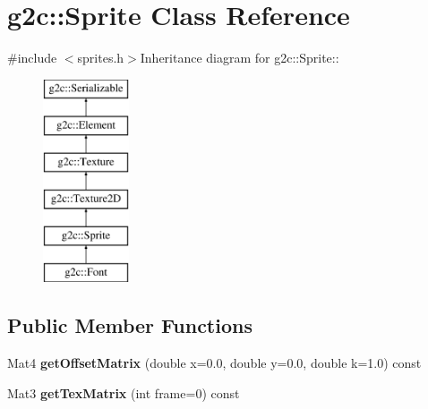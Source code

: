 \hypertarget{classg2c_1_1_sprite}{
\section{g2c::Sprite Class Reference}
\label{classg2c_1_1_sprite}
}


{\ttfamily \#include $<$sprites.h$>$}Inheritance diagram for g2c::Sprite::\begin{figure}[H]
\begin{center}
\leavevmode
\includegraphics[height=6cm]{classg2c_1_1_sprite}
\end{center}
\end{figure}
\subsection*{Public Member Functions}
\begin{DoxyCompactItemize}
\item 
\hypertarget{classg2c_1_1_sprite_ab605111518df32637cbb10f442071a5b}{
Mat4 {\bfseries getOffsetMatrix} (double x=0.0, double y=0.0, double k=1.0) const }
\label{classg2c_1_1_sprite_ab605111518df32637cbb10f442071a5b}

\item 
\hypertarget{classg2c_1_1_sprite_a138759194d8d7be86e27dea0c6a0897b}{
Mat3 {\bfseries getTexMatrix} (int frame=0) const }
\label{classg2c_1_1_sprite_a138759194d8d7be86e27dea0c6a0897b}

\end{DoxyCompactItemize}
